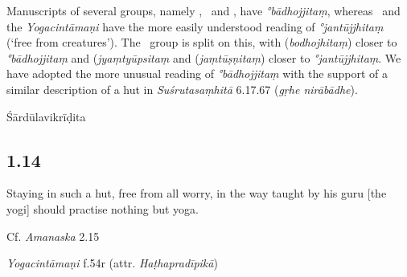 \begin{ekdosis}
\begin{philcomm}[hp01_013]

Manuscripts of several groups, namely \textbeta, \textepsilon\ and \texteta, have \emph{°bādhojjitaṃ}, whereas \textdelta\ and the \emph{Yogacintāmaṇi} have the more easily understood reading of \emph{°jantūjjhitaṃ} (‘free from creatures’). The \textalpha\ group is split on this, with  (\emph{bodhojhitaṃ}) closer to \emph{°bādhojjitaṃ} and  (\emph{jyaṃtyūpsitaṃ} and  (\emph{jaṃtūṣṇitaṃ}) closer to \emph{°jantūjjhitaṃ}. We have adopted the more unusual reading of \emph{°bādhojjitaṃ}  with the support of a similar description of a hut in \emph{Suśrutasaṃhitā} 6.17.67 (\emph{gṛhe nirābādhe}). 

\end{philcomm}

\begin{metre}[hp01_013]
Śārdūlavikrīḍita
\end{metre}

\subsection*{1.14}
\begin{translation}[hp01_014]
Staying in such a hut, free from all worry, in the way taught by his guru [the yogi] should practise nothing but yoga.
\end{translation}

\begin{sources}[hp01_014]
Cf. \emph{Amanaska} 2.15

\begin{versinnote}
\end{versinnote}

\end{sources}

\begin{testimonia}[hp01_014]
\emph{Yogacintāmaṇi} f.54r (attr. \emph{Haṭhapradīpikā})

\begin{versinnote}
\end{versinnote}


\end{testimonia}
\end{ekdosis}
